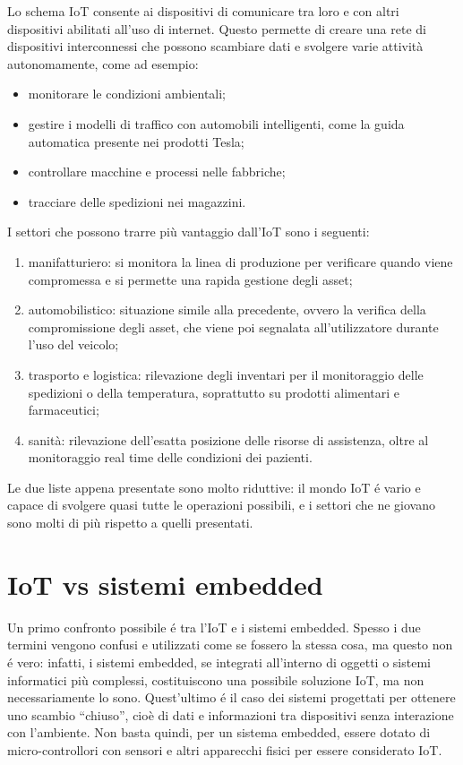 \noindent Lo schema IoT consente ai dispositivi di comunicare tra loro e con altri dispositivi abilitati all'uso di internet. Questo permette di creare una rete di dispositivi interconnessi che possono scambiare dati e svolgere varie attività autonomamente, come ad esempio: \begin{itemize}
    \item monitorare le condizioni ambientali;
    \item gestire i modelli di traffico con automobili intelligenti, come la guida automatica presente nei prodotti Tesla;
    \item controllare macchine e processi nelle fabbriche;
    \item tracciare delle spedizioni nei magazzini.
\end{itemize}
I settori che possono trarre più vantaggio dall'IoT sono i seguenti\cite{iot-use}: \begin{enumerate}
    \item manifatturiero: si monitora la linea di produzione per verificare quando viene compromessa e si permette una rapida gestione degli asset;
    \item automobilistico: situazione simile alla precedente, ovvero la verifica della compromissione degli asset, che viene poi segnalata all'utilizzatore durante l'uso del veicolo; 
    \item trasporto e logistica: rilevazione degli inventari per il monitoraggio delle spedizioni o della temperatura, soprattutto su prodotti alimentari e farmaceutici;
    \item sanità: rilevazione dell'esatta posizione delle risorse di assistenza, oltre al monitoraggio real time delle condizioni dei pazienti.
\end{enumerate}
\noindent Le due liste appena presentate sono molto riduttive: il mondo IoT é vario e capace di svolgere quasi tutte le operazioni possibili, e i settori che ne giovano sono molti di più rispetto a quelli presentati.

\section{IoT vs sistemi embedded}

Un primo confronto possibile é tra l'IoT e i sistemi embedded. Spesso i due termini vengono confusi e utilizzati come se fossero la stessa cosa, ma questo non é vero: infatti, i sistemi embedded, se integrati all’interno di oggetti o sistemi informatici più complessi, costituiscono una possibile soluzione IoT, ma non necessariamente lo sono. Quest'ultimo é il caso dei sistemi progettati per ottenere uno scambio “chiuso”, cioè di dati e informazioni tra dispositivi senza interazione con l’ambiente. Non basta quindi, per un sistema embedded, essere dotato di micro-controllori con sensori e altri apparecchi fisici per essere considerato IoT\cite{iot-embedded}.

